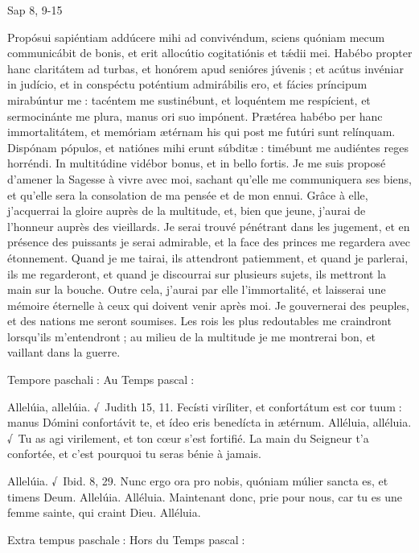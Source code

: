 \begin{paracol}{2}
Sap 8, 9-15
\switchcolumn

\switchcolumn*

Propósui sapiéntiam addúcere mihi  ad convivéndum, sciens quóniam mecum communicábit de bonis, et erit allocútio cogitatiónis et tǽdii mei. Habébo propter hanc claritátem ad turbas, et honórem apud senióres júvenis ; et acútus invéniar in judício, et in conspéctu poténtium admirábilis ero, et fácies príncipum mirabúntur me : tacéntem me sustinébunt, et loquéntem me respícient, et sermocinánte me plura, manus ori suo impónent. Prætérea habébo per hanc immortalitátem, et memóriam ætérnam his qui post me futúri sunt relínquam. Dispónam pópulos, et natiónes mihi erunt súbditæ : timébunt me audiéntes reges horréndi. In multitúdine vidébor bonus, et in bello fortis.
\switchcolumn
Je me suis proposé d’amener la Sagesse  à vivre avec moi, sachant qu’elle me communiquera ses biens, et qu’elle sera la consolation de ma pensée et de mon ennui. Grâce à elle, j’acquerrai la gloire auprès de la multitude, et, bien que jeune, j’aurai de l’honneur auprès des vieillards. Je serai trouvé pénétrant dans les jugement, et en présence des puissants je serai admirable, et la face des princes me regardera avec étonnement. Quand je me tairai, ils attendront patiemment, et quand je parlerai, ils me regarderont, et quand je discourrai sur plusieurs sujets, ils mettront la main sur la bouche. Outre cela, j’aurai par elle l’immortalité, et laisserai une mémoire éternelle à ceux qui doivent venir après moi. Je gouvernerai des peuples, et des nations me seront soumises. Les rois les plus redoutables me craindront lorsqu’ils m’entendront ; au milieu de la multitude je me montrerai bon, et vaillant dans la guerre.
\switchcolumn*

Tempore paschali :
\switchcolumn
Au Temps pascal :
\switchcolumn*

Allelúia, allelúia. √~Judith 15, 11. Fecísti viríliter, et confortátum est cor tuum : manus Dómini confortávit te, et ídeo eris benedícta in ætérnum.
\switchcolumn
Alléluia, alléluia. √~Tu as agi virilement, et ton cœur s’est fortifié. La main du Seigneur t’a confortée, et c’est pourquoi tu seras bénie à jamais.
\switchcolumn*

Allelúia. √~Ibid. 8, 29. Nunc ergo ora pro nobis, quóniam múlier sancta es, et timens Deum. Allelúia.
\switchcolumn
Alléluia. Maintenant donc, prie pour nous, car tu es une femme sainte, qui craint Dieu. Alléluia.
\switchcolumn*

Extra tempus paschale :
\switchcolumn
Hors du Temps pascal :
\switchcolumn*


\end{paracol}
